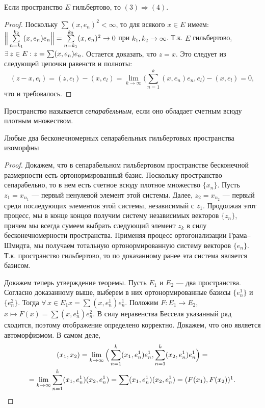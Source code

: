 \documentclass[10pt]{article}
\newcommand*{\p}[1]{#1\nobreak\discretionary{}{\hbox{$\mathsurround=0pt #1$}}{}}
\begin{document}
\begin{theorem}
Если пространство $E$ гильбертово, то $(3)\Rightarrow(4)$.
\end{theorem}

\begin{proof}
Поскольку $\sum(x,e_n)^2<\infty$, то для всякого $x\in E$ имеем:
$\Big\|\sum\limits_{n=k_1}^{k_2}(x,e_n)e_n\Big\|\p=\sum\limits_{n=k_1}^{k_2}
(x,e_n)^2\to 0$ при $k_1,k_2\to\infty$. Т.к. $E$ гильбертово,
$\exists\,z\in E:z\p=\sum(x,e_n)e_n$. Остается доказать, что $z=x$.
Это следует из следующей цепочки равенств и полноты:
$$(z-x,e_l)=(z,e_l)-(x,e_l)=\lim\limits_{k\to\infty}\Big(\sum\limits_{n=1}^k
(x,e_n)e_n, e_l\Big)-(x,e_l)=0,$$ что и требовалось.
\end{proof}

\begin{df}
Пространство называется \emph{сепарабельным}, если оно обладает
счетным всюду плотным множеством.
\end{df}

\begin{theorem}
Любые два бесконечномерных сепарабельных гильбертовых пространства
изоморфны
\end{theorem}

\begin{proof}
Докажем, что в сепарабельном гильбертовом простра\-нстве бесконечной
размерности есть ортонормированный базис. Поскольку пространство
сепарабельно, то в нем есть счетное всюду плотное множество
$\{x_n\}$. Пусть $z_1=x_{n_1}$ --- первый ненулевой элемент этой
системы. Далее, $z_2=x_{n_2}$ --- первый среди последующих элементов
этой системы, независимый с $z_1$. Продолжая этот процесс, мы в
конце концов получим систему независимых векторов $\{z_n\}$, причем
мы всегда сумеем выбрать следующий элемент $z_k$ в силу
бесконечномерности пространства. Применяя процесс ортогонализации
Грама--Шмидта, мы получаем тотальную ортонормированную систему
векторов $\{e_n\}$. Т.к. пространство гильбертово, то по доказанному
ранее эта система является базисом.

Докажем теперь утверждение теоремы. Пусть $E_1$ и $E_2$ --- два
пространства. Согласно доказанному выше, выберем в них
ортонормированные базисы $\{e_n^1\}$ и $\{e_n^2\}$. Тогда
$\forall\,x\in E_1$\;\;$x=\sum(x,e_n^1)e_n^1$. Положим $F\colon
E_1\to E_2$, $x\mapsto F(x)=\sum(x,e_n^1)e_n^2$. В силу неравенства
Бесселя указанный ряд сходится, поэтому отображение определено
корректно. Докажем, что оно является автоморфизмом. В самом деле,
\begin{multline*}
(x_1,x_2)=\lim\limits_{k\to\infty}\Big(\sum\limits_{n=1}^k(x_1,e_n^1)e_n^1,
\sum\limits_{n=1}^k(x_2,e_n^1)e_n^1\Big)=\\
=\lim\limits_{k\to\infty} \sum\limits_{n=1}^k(x_1,e_n^1)(x_2,e_n^1)=
\sum\limits(x_1,e_n^1)(x_2,e_n^1)=(F(x_1),F(x_2))\footnotemark.
\end{multline*}
\end{proof}
\end{document}
